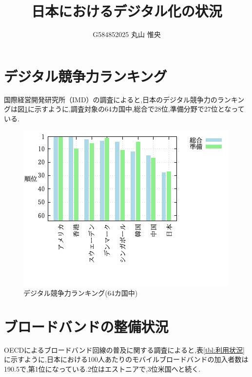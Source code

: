 \documentclass[a4paper,11pt,dvipdfmx]{ujarticle}
\title{日本におけるデジタル化の状況}
\author{G584852025 丸山 惟央}
\begin{document}
\maketitle %

\section{デジタル競争力ランキング}
国際経営開発研究所（IMD）の調査\cite{oecd}によると,日本のデジタル競争力のランキングは図\ref{fig:加入率}に示すように,調査対象の64カ国中,総合で28位,準備分野で27位となっている.

\begin{figure}[htbp]
\includegraphics{G584852025.png}
\centering
\caption{デジタル競争力ランキング(64カ国中)}\label{fig:加入率}
\end{figure}














\section{ブロードバンドの整備状況}
OECDによるブロードバンド回線の普及に関する調査\cite{imd}によると,表\ref{tbl:利用状況}に示すように,日本における100人あたりのモバイルブロードバンドの加入者数は 190.5で,第1位になっている.2位はエストニアで,3位米国へと続く.
\end{document}
